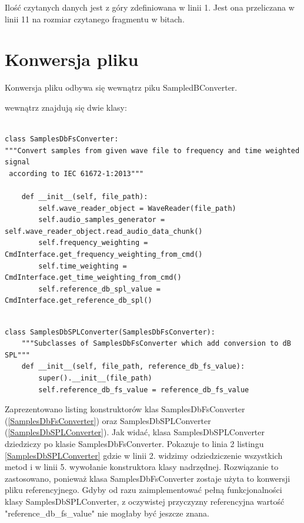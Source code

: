 \documentclass[eng,printmode]{mgr}
\begin{document}
Ilość czytanych danych jest z góry zdefiniowana w linii 1. Jest ona przeliczana w linii 11 na rozmiar czytanego fragmentu w bitach. 

\section{Konwersja pliku}
Konwersja pliku odbywa się wewnątrz piku SampledBConverter. 

wewnątrz znajdują się dwie klasy:

\begin{minipage}{\linewidth}
\begin{lstlisting}[caption={fragment kodu źródłowego pliku SampledBConverter.py,\newline klasa SamplesDbFSConverter},captionpos=b,label={SamplesDbFsConverter}]

class SamplesDbFsConverter:
"""Convert samples from given wave file to frequency and time weighted signal
 according to IEC 61672-1:2013"""

    def __init__(self, file_path):
        self.wave_reader_object = WaveReader(file_path)
        self.audio_samples_generator = self.wave_reader_object.read_audio_data_chunk()
        self.frequency_weighting = CmdInterface.get_frequency_weighting_from_cmd()
        self.time_weighting = CmdInterface.get_time_weighting_from_cmd()
        self.reference_db_spl_value = CmdInterface.get_reference_db_spl()
\end{lstlisting}
\end{minipage}

\begin{minipage}{\linewidth}
\begin{lstlisting}[caption={fragment kodu źródłowego pliku SampledBConverter.py, klasa SamplesDbSPLConverter},captionpos=b,label={SamplesDbSPLConverter}]

class SamplesDbSPLConverter(SamplesDbFsConverter):
    """Subclasses of SamplesDbFsConverter which add conversion to dB SPL"""
    def __init__(self, file_path, reference_db_fs_value):
        super().__init__(file_path)
        self.reference_db_fs_value = reference_db_fs_value

\end{lstlisting}
\end{minipage}

Zaprezentowano listing konstruktorów klas SamplesDbFsConverter (\ref{SamplesDbFsConverter}) oraz  SamplesDbSPLConverter (\ref{SamplesDbSPLConverter}). Jak widać, klasa SamplesDbSPLConverter dziedziczy po klasie SamplesDbFsConverter. Pokazuje to linia 2 listingu \ref{SamplesDbSPLConverter} gdzie w linii 2. widzimy odziedziczenie wszystkich metod i w linii 5. wywołanie konstruktora klasy nadrzędnej. Rozwiązanie to zastosowano, ponieważ klasa SamplesDbFsConverter zostaje użyta to konwersji pliku referencyjnego. Gdyby od razu zaimplementować pełną funkcjonalności klasy SamplesDbSPLConverter, z oczywistej przyczyzny referencyjna wartość "reference\_db\_fs\_value" nie mogłaby być jeszcze znana. 
\end{document}
